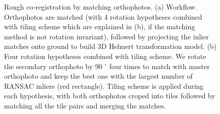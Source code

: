 \begin{figure}[htbp]
    \begin{center}
        \caption{Rough co-registration by matching orthophotos. (a) Workflow. Orthophotos are matched (with 4 rotation hypotheses combined with tiling scheme which are explained in (b), if the matching method is not rotation invariant), followed by projecting the inlier matches onto ground to build 3D Helmert transformation model. (b) Four rotation hypotheses combined with tiling scheme. We rotate the secondary orthophoto by 90 $^\circ$ four times to match with master orthophoto and keep the best one with the largest number of RANSAC inliers (red rectangle). Tiling scheme is applied during each hypothesis, with both orthophotos croped into tiles followed by matching all the tile pairs and merging the matches.}
        \label{WorkflowOrtho}
    \end{center}
\end{figure}

